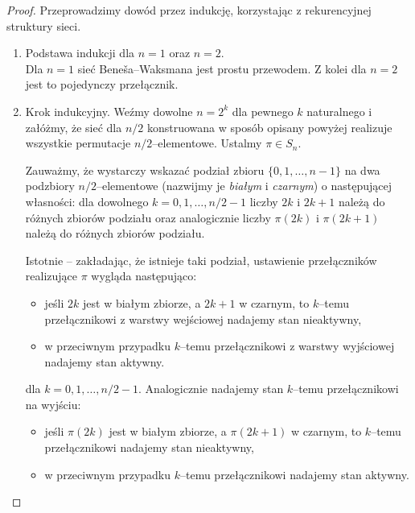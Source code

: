 \documentclass[a4paper]{article}
\theoremstyle{definition}
\begin{document}
\begin{proof}
Przeprowadzimy dowód przez indukcję, korzystając z rekurencyjnej struktury sieci. 

    \begin{enumerate} 
        \item Podstawa indukcji dla $n = 1$ oraz $n = 2$. \\
        Dla $n = 1$ sieć Beneša--Waksmana jest prostu przewodem. Z kolei dla $n = 2$ jest to pojedynczy przełącznik.

        \item Krok indukcyjny. Weźmy dowolne $n = 2^k$ dla pewnego $k$ naturalnego i załóżmy, że sieć dla \(n/2\) konstruowana w sposób opisany powyżej realizuje wszystkie permutacje $n/2$--elementowe. 
        Ustalmy \(\pi \in S_n\).
        
        Zauważmy, że wystarczy wskazać podział zbioru \(\{0, 1, \ldots, n-1\}\) na dwa podzbiory \(n/2\)--elementowe (nazwijmy je \emph{białym} i \emph{czarnym}) o następującej własności: dla dowolnego \(k = 0, 1, \ldots, n/2 - 1\) liczby \(2k\) i \(2k+1\) należą do różnych zbiorów podziału oraz analogicznie liczby \(\pi(2k)\) i \(\pi(2k+1)\) należą do różnych zbiorów podziału.

        \vspace{.5em}

        Istotnie -- zakładając, że istnieje taki podział, ustawienie przełączników realizujące \(\pi\) wygląda następująco: 

        \begin{itemize}
            \item jeśli \(2k\) jest w białym zbiorze, a \(2k+1\) w czarnym, to \(k\)--temu przełącznikowi z warstwy wejściowej nadajemy stan nieaktywny,
            \item w przeciwnym przypadku \(k\)--temu przełącznikowi z warstwy wyjściowej nadajemy stan aktywny.  
        \end{itemize}
        dla \(k = 0, 1, \ldots, n/2-1\). Analogicznie nadajemy stan \(k\)--temu przełącznikowi na wyjściu:
        \begin{itemize}
            \item jeśli \(\pi(2k)\) jest w białym zbiorze, a \(\pi(2k+1)\) w czarnym, to \(k\)--temu przełącznikowi nadajemy stan nieaktywny,
            \item w przeciwnym przypadku \(k\)--temu przełącznikowi nadajemy stan aktywny.  
        \end{itemize}


\end{enumerate}
\end{proof}
\end{document}
